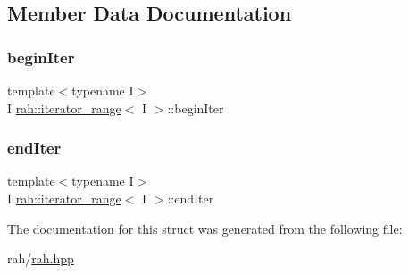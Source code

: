 \subsection{Member Data Documentation}
\mbox{\label{structrah_1_1iterator__range_a97263772394bcdb263d128d3157bffb1}} 
\subsubsection{\texorpdfstring{beginIter}{beginIter}}
{\footnotesize\ttfamily template$<$typename I$>$ \\
I \mbox{\hyperlink{structrah_1_1iterator__range}{rah\+::iterator\+\_\+range}}$<$ I $>$\+::begin\+Iter}

\mbox{\label{structrah_1_1iterator__range_a8008a95fc7f6b6042510261e6b06de1f}} 
\subsubsection{\texorpdfstring{endIter}{endIter}}
{\footnotesize\ttfamily template$<$typename I$>$ \\
I \mbox{\hyperlink{structrah_1_1iterator__range}{rah\+::iterator\+\_\+range}}$<$ I $>$\+::end\+Iter}



The documentation for this struct was generated from the following file\+:\begin{DoxyCompactItemize}
\item 
rah/\mbox{\hyperlink{rah_8hpp}{rah.\+hpp}}\end{DoxyCompactItemize}
